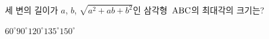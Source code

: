세 변의 길이가 $a$, $b$, $\sqrt{a^2+ab+b^2}$인 삼각형~$\mathrm{ABC}$의 최대각의 크기는? 
\begin{choices32}{$60^\circ$}{$90^\circ$}{$120^\circ$}{$135^\circ$}{$150^\circ$}\end{choices32}
